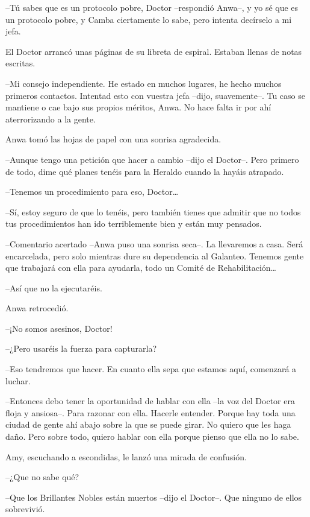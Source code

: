 {--Tú sabes que es un protocolo pobre, Doctor --respondió Anwa--, y yo
	sé que es un protocolo pobre, y Camba ciertamente lo sabe, pero intenta
decírselo a mi jefa.}

{El Doctor arrancó unas páginas de su libreta de espiral. Estaban llenas
de notas escritas.}

{--Mi consejo independiente. He estado en muchos lugares, he hecho
	muchos primeros contactos. Intentad esto con vuestra jefa --dijo,
	suavemente--. Tu caso se mantiene o cae bajo sus propios méritos, Anwa.
No hace falta ir por ahí aterrorizando a la gente.}

{Anwa tomó las hojas de papel con una sonrisa agradecida.}

{--Aunque tengo una petición que hacer a cambio --dijo el Doctor--.
	Pero primero de todo, dime qué planes tenéis para la Heraldo cuando la
hayáis atrapado.}

{--Tenemos un procedimiento para eso, Doctor\ldots{}}

{--Sí, estoy seguro de que lo tenéis, pero también tienes que admitir
	que no todos tus procedimientos han ido terriblemente bien y están muy
pensados.}

{--Comentario acertado --Anwa puso una sonrisa seca--. La llevaremos a
	casa. Será encarcelada, pero solo mientras dure su dependencia al
	Galanteo. Tenemos gente que trabajará con ella para ayudarla, todo un
	Comité de Rehabilitación\ldots{}}

{--Así que no la ejecutaréis.}

{Anwa retrocedió.}

{--¡No somos asesinos, Doctor!}

{--¿Pero usaréis la fuerza para capturarla?}

{--Eso tendremos que hacer. En cuanto ella sepa que estamos aquí,
comenzará a luchar.}

{--Entonces debo tener la oportunidad de hablar con ella --la voz del
	Doctor era floja y ansiosa--. Para razonar con ella. Hacerle entender.
	Porque hay toda una ciudad de gente ahí abajo sobre la que se puede
	girar. No quiero que les haga daño. Pero sobre todo, quiero hablar con
ella porque pienso que ella no lo sabe.}

{Amy, escuchando a escondidas, le lanzó una mirada de confusión.}

{--¿Que no sabe qué?}

{--Que los Brillantes Nobles están muertos --dijo el Doctor--. Que
ninguno de ellos sobrevivió.}


